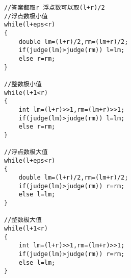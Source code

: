 \begin{lstlisting}
//答案都取r 浮点数可以取(l+r)/2
//浮点数极小值
while(l+eps<r)
{
    double lm=(l+r)/2,rm=(lm+r)/2;
    if(judge(lm)>judge(rm)) l=lm;
    else r=rm;
}

//整数极小值
while(l+1<r)
{
    int lm=(l+r)>>1,rm=(lm+r)>>1;
    if(judge(lm)>judge(rm)) l=lm;
    else r=rm;
}

//浮点数极大值
while(l+eps<r)
{
    double lm=(l+r)/2,rm=(lm+r)/2;
    if(judge(lm)>judge(rm)) r=rm;
    else l=lm;
}

//整数极大值
while(l+1<r)
{
    int lm=(l+r)>>1,rm=(lm+r)>>1;
    if(judge(lm)>judge(rm)) r=rm;
    else l=lm;
}
\end{lstlisting}